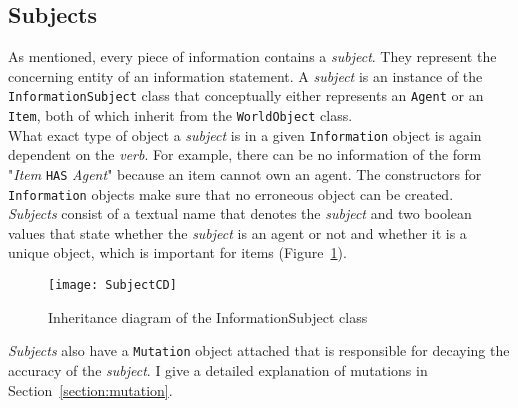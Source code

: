 \subsection{Subjects}
As mentioned, every piece of information contains a \textit{subject}. They represent the concerning entity of an information statement. A \textit{subject} is an instance of the \verb|InformationSubject| class that conceptually either represents an \verb|Agent| or an \verb|Item|, both of which inherit from the \verb|WorldObject| class.\\
What exact type of object a \textit{subject} is in a given \verb|Information| object is again dependent on the \textit{verb}. For example, there can be no information of the form "\textit{Item} \verb|HAS| \textit{Agent}" because an item cannot own an agent. The constructors for \verb|Information| objects make sure that no erroneous object can be created.\\
\textit{Subjects} consist  of a textual name that denotes the \textit{subject} and two boolean values that state whether the \textit{subject} is an agent or not and whether it is a unique object, which is important for items (Figure~\ref{fig:subjectCD}).
\begin{figure}
	\centering
	\texttt{[image: SubjectCD]}
	\caption{Inheritance diagram of the InformationSubject class}
	\label{fig:subjectCD}
\end{figure}
\textit{Subjects} also have a \verb|Mutation| object attached that is responsible for decaying the accuracy of the \textit{subject}. I give a detailed explanation of mutations in Section~\ref{section:mutation}.
